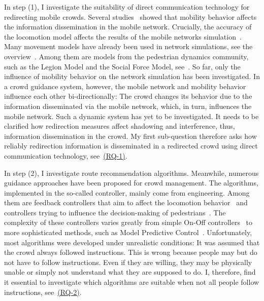 In step (1), I investigate the suitability of direct communication technology for redirecting mobile crowds. Several studies~\cite{grossglauser-2002-com,bai-2003-com,helgason-2014-com,maccartney-2017-com,chaintreau-2007-cdyn,chancay-2018-com} showed that mobility behavior affects the information dissemination in the mobile network. Crucially, the accuracy of the locomotion model affects the results of the mobile networks simulation~\cite{wischhof-2022b-com}. Many movement models have already been used in network simulations, see the overview~\cite{zhang-2017-com}. Among them are models from the pedestrian dynamics community, such as the Legion Model and the Social Force Model, see~\cite{chancay-2018-com,helgason-2014-com}. So far, only the influence of mobility behavior on the network simulation has been investigated. In a crowd guidance system, however, the mobile network and mobility behavior influence each other bi-directionally: The crowd changes its behavior due to the information disseminated via the mobile network, which, in turn, influences the mobile network.
Such a dynamic system has yet to be investigated. It needs to be clarified how redirection measures affect shadowing and interference, thus, information dissemination in the crowd. My first sub-question therefore asks how reliably redirection information is disseminated in a redirected crowd using direct communication technology, see~\hyperref[reserachquestions]{(RQ-1)}. 



In step (2), I investigate route recommendation algorithms. Meanwhile, numerous guidance approaches have been proposed for crowd management. The algorithms, implemented in the so-called controller, mainly come from engineering. Among them are feedback controllers that aim to affect the locomotion behavior~\cite{kachroo-2010-cdyn, shende-2011-cdyn, shende-2013-cdyn} and controllers trying to influence the decision-making of pedestrians~\cite{zhang-2016-cdyn}. The complexity of these controllers varies greatly from simple On-Off controllers~\cite{gao-2022-cdyn} to more sophisticated methods, such as Model Predictive Control~\cite{menner-2023-cdyn}. 
Unfortunately, most algorithms were developed under unrealistic conditions: It was assumed that the crowd always followed instructions. This is wrong because people may but do not have to follow instructions. Even if they are willing, they may be physically unable or simply not understand what they are supposed to do. I, therefore, find it essential to investigate which algorithms are suitable when not all people follow instructions, see~\hyperref[reserachquestions]{(RQ-2)}.  



